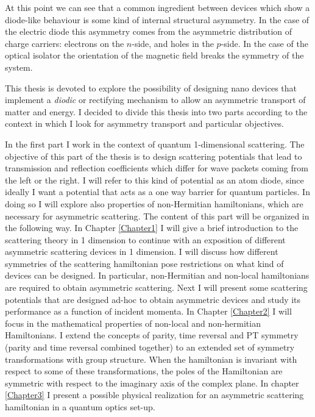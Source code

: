 At this point we can see that a common ingredient between devices which show a diode-like behaviour is some kind of internal structural asymmetry. In the case of the electric diode this asymmetry comes from the asymmetric distribution of charge carriers: electrons on the $n$-side, and holes in the $p$-side. In the case of the optical isolator the orientation of the magnetic field breaks the symmetry of the system.

This thesis is devoted to explore the possibility of designing nano devices that implement a \textit{diodic} or rectifying mechanism to allow an asymmetric transport of matter and energy. I decided to divide this thesis into two parts according to the context in which I look for asymmetry transport and particular objectives.

In the first part I work in the context of quantum 1-dimensional scattering. The objective of this part of the thesis is to design scattering potentials that lead to transmission and reflection coefficients which differ for wave packets coming from the left or the right. I will refer to this kind of potential as an atom diode, since ideally I want a potential that acts as a one way barrier for quantum particles. In doing so I will explore also properties of non-Hermitian hamiltonians, which are necessary for asymmetric scattering. The content of this part will be organized in the following way. In Chapter \ref{Chapter1} I will give a brief introduction to the scattering theory in 1 dimension to continue with an exposition of different asymmetric scattering devices in 1 dimension. I will discuss how different symmetries of the scattering hamiltonian pose restrictions on what kind of devices can be designed. In particular, non-Hermitian and non-local hamiltonians are required to obtain asymmetric scattering. Next I will present some scattering potentials that are designed ad-hoc to obtain asymmetric devices and study its performance as a function of incident momenta. In Chapter \ref{Chapter2} I will focus in the mathematical properties of non-local and non-hermitian Hamiltonians. I extend the concepts of parity, time reversal and PT symmetry (parity and time reversal combined together) to an extended set of symmetry transformations with group structure. When the hamiltonian is invariant with respect to some of these transformations, the poles of the Hamiltonian are symmetric with respect to the imaginary axis of the complex plane. In chapter \ref{Chapter3} I present a possible physical realization for an asymmetric scattering hamiltonian in a quantum optics set-up.



